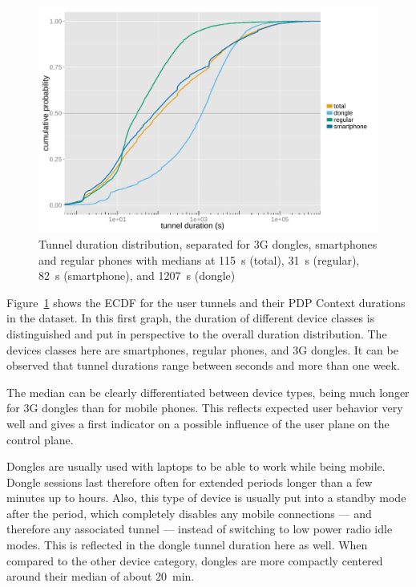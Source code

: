 \begin{figure}[htb]
	\centering
	\includegraphics[width=1.0\textwidth]{images/R-tunnel-duration-device-type.pdf}
	\caption{Tunnel duration distribution, separated for \gls{3G} dongles, smartphones and regular phones with medians at \SI{115}{\second} (total), \SI{31}{\second} (regular), \SI{82}{\second} (smartphone), and \SI{1207}{\second} (dongle)}
\label{c4:fig:cdf-duration-device-class}
\end{figure}

Figure~\ref{c4:fig:cdf-duration-device-class} shows the \gls{ECDF} for the user tunnels and their \gls{PDP} Context durations in the dataset. In this first graph, the duration of different device classes is distinguished and put in perspective to the overall duration distribution. The devices classes here are smartphones, regular phones, and \gls{3G} dongles. It can be observed that tunnel durations range between seconds and more than one week.

The median can be clearly differentiated between device types, being much longer for \gls{3G} dongles than for mobile phones. This reflects expected user behavior very well and gives a first indicator on a possible influence of the user plane on the control plane.

Dongles are usually used with laptops to be able to work while being mobile. Dongle sessions last therefore often for extended periods longer than a few minutes up to hours. Also, this type of device is usually put into a standby mode after the period, which completely disables any mobile connections --- and therefore any associated tunnel --- instead of switching to low power radio idle modes. This is reflected in the dongle tunnel duration here as well. When compared to the other device category, dongles are more compactly centered around their median of about \SI{20}{\minute}.

